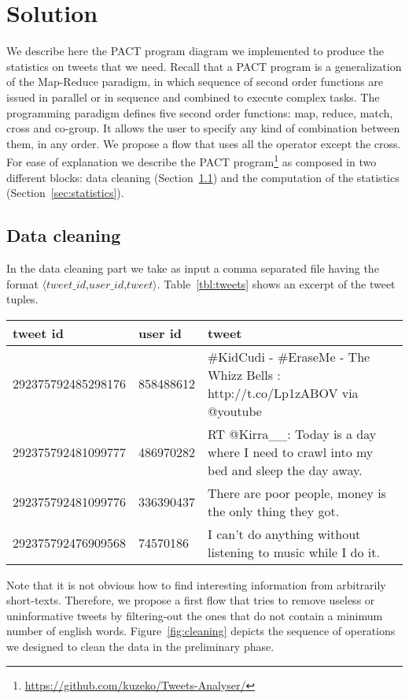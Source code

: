 \section{Solution}
\label{sec:solution}


We describe here the PACT program diagram we implemented to produce the statistics on tweets that we need. 
Recall that a PACT program is a generalization of the Map-Reduce paradigm, in which sequence of second order functions are issued in parallel or in sequence and combined to execute complex tasks. 
The programming paradigm defines five second order functions: map, reduce, match, cross and co-group.
It allows the user to specify any kind of combination between them, in any order.
We propose a flow that uses all the operator except the cross.
For ease of explanation we describe the PACT program\footnote{\url{https://github.com/kuzeko/Tweets-Analyser/}} as composed in two different blocks: data cleaning (Section~\ref{sec:cleaning}) and the computation of the statistics (Section~\ref{sec:statistics}).

\subsection{Data cleaning}
\label{sec:cleaning}
In the data cleaning part we take as input a comma separated file having the format $\langle tweet\_id$,$user\_id$,$tweet \rangle$. 
Table~\ref{tbl:tweets} shows an excerpt of the tweet tuples. 

\begin{table*}[!t]
\begin{tabular}{|l|l|l|}
\hline
tweet id & user id & tweet\\
\hline
292375792485298176&858488612& \#KidCudi - \#EraseMe - The Whizz Bells : http://t.co/Lp1zABOV via @youtube\\
292375792481099777&486970282& RT @Kirra\_\_: Today is a day where I need to crawl into my bed and sleep the day away.\\
292375792481099776&336390437& There are poor people, money is the only thing they got.\\
292375792476909568&74570186& I can't do anything without listening to music while I do it.\\
\hline
\end{tabular}
\caption{A sample of the tweet dataset}
\label{tbl:tweets}
\end{table*}

Note that it is not obvious how to find interesting information from arbitrarily short-texts.
Therefore, we propose a first flow that tries to remove useless or uninformative tweets by filtering-out the ones that do not contain a minimum number of english words. 
Figure~\ref{fig:cleaning} depicts the sequence of operations we designed to clean the data in the preliminary phase. 

